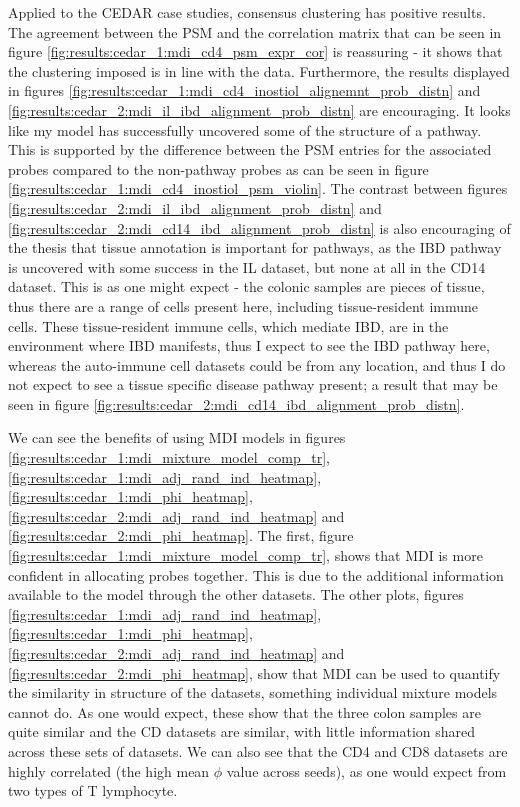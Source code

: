 \documentclass[12pt]{article} %
\begin{document}
	Applied to the CEDAR case studies, consensus clustering has positive results. The agreement between the PSM and the correlation matrix that can be seen in figure \ref{fig:results:cedar_1:mdi_cd4_psm_expr_cor} is reassuring - it shows that the clustering imposed is in line with the data. Furthermore, the results displayed in figures \ref{fig:results:cedar_1:mdi_cd4_inostiol_alignemnt_prob_distn} and \ref{fig:results:cedar_2:mdi_il_ibd_alignment_prob_distn} are encouraging. It looks like my model has successfully uncovered some of the structure of a pathway. This is supported by the difference between the PSM entries for the associated probes compared to the non-pathway probes as can be seen in figure \ref{fig:results:cedar_1:mdi_cd4_inostiol_psm_violin}. The contrast between figures \ref{fig:results:cedar_2:mdi_il_ibd_alignment_prob_distn} and \ref{fig:results:cedar_2:mdi_cd14_ibd_alignment_prob_distn} is also encouraging of the thesis that tissue annotation is important for pathways, as the IBD pathway is uncovered with some success in the IL dataset, but none at all in the CD14 dataset. This is as one might expect - the colonic samples are pieces of tissue, thus there are a range of cells present here, including tissue-resident immune cells. These tissue-resident immune cells, which mediate IBD, are in the environment where IBD manifests, thus I expect to see the IBD pathway here, whereas the auto-immune cell datasets could be from any location, and thus I do not expect to see a tissue specific disease pathway present; a result that may be seen in figure \ref{fig:results:cedar_2:mdi_cd14_ibd_alignment_prob_distn}.
	
	We can see the benefits of using MDI models in figures \ref{fig:results:cedar_1:mdi_mixture_model_comp_tr}, \ref{fig:results:cedar_1:mdi_adj_rand_ind_heatmap}, \ref{fig:results:cedar_1:mdi_phi_heatmap}, \ref{fig:results:cedar_2:mdi_adj_rand_ind_heatmap} and \ref{fig:results:cedar_2:mdi_phi_heatmap}. The first, figure \ref{fig:results:cedar_1:mdi_mixture_model_comp_tr}, shows that MDI is more confident in allocating probes together. This is due to the additional information available to the model through the other datasets. The other plots, figures \ref{fig:results:cedar_1:mdi_adj_rand_ind_heatmap}, \ref{fig:results:cedar_1:mdi_phi_heatmap}, \ref{fig:results:cedar_2:mdi_adj_rand_ind_heatmap} and \ref{fig:results:cedar_2:mdi_phi_heatmap}, show that MDI can be used to quantify the similarity in structure of the datasets, something individual mixture models cannot do. As one would expect, these show that the three colon samples are quite similar and the CD datasets are similar, with little information shared across these sets of datasets. We can also see that the CD4 and CD8 datasets are highly correlated (the high mean $\phi$ value across seeds), as one would expect from two types of T lymphocyte.
	
\end{document}
